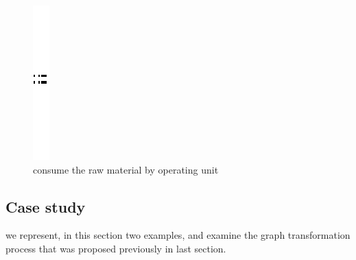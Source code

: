 \begin{figure}[th]
\centering
		\quad{}\quad{}
			\includegraphics{ch3/img/sep}
	\quad{}\quad{}
\caption{\label{fig:consume the raw material by operating unit} consume the raw material by operating unit}
\end{figure}

\pagebreak


\subsection{Case study}
we represent, in this section two examples, and examine the graph transformation process that was proposed previously in last section.
